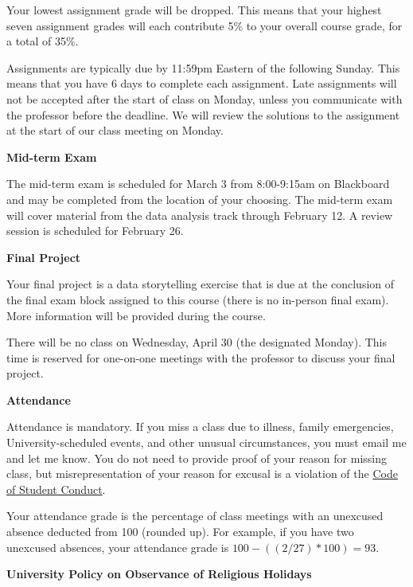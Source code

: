 \documentclass[12pt,letterpaper]{article}
\begin{document}
Your lowest assignment grade will be dropped. This means that your highest seven assignment grades will each contribute 5\% to your overall course grade, for a total of 35\%. \par

Assignments are typically due by 11:59pm Eastern of the following Sunday. This means that you have 6 days to complete each assignment. Late assignments will not be accepted after the start of class on Monday, unless you communicate with the professor before the deadline. We will review the solutions to the assignment at the start of our class meeting on Monday. \par

\textbf{Mid-term Exam}

The mid-term exam is scheduled for March 3 from 8:00-9:15am on Blackboard and may be completed from the location of your choosing. The mid-term exam will cover material from the data analysis track through February 12. A review session is scheduled for February 26.

\textbf{Final Project}

Your final project is a data storytelling exercise that is due at the conclusion of the final exam block assigned to this course (there is no in-person final exam). More information will be provided during the course. \par

There will be no class on Wednesday, April 30 (the designated Monday). This time is reserved for one-on-one meetings with the professor to discuss your final project.

\textbf{Attendance}

Attendance is mandatory. If you miss a class due to illness, family emergencies, University-scheduled events, and other unusual circumstances, you must email me and let me know. You do not need to provide proof of your reason for missing class, but misrepresentation of your reason for excusal is a violation of the \href{https://studentconduct.gwu.edu/code-student-conduct}{Code of Student Conduct}. \par

Your attendance grade is the percentage of class meetings with an unexcused absence deducted from 100 (rounded up). For example, if you have two unexcused absences, your attendance grade is $100-((2/27)*100) = 93$. \par

\textbf{University Policy on Observance of Religious Holidays} \par
\end{document}
